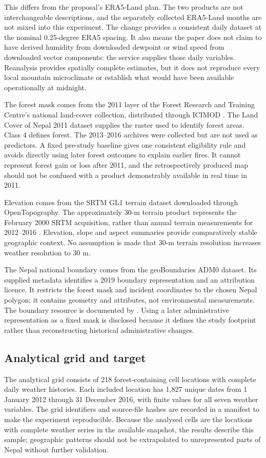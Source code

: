 \documentclass[conference,a4paper]{IEEEtran}
\begin{document}
This differs from the proposal's ERA5-Land plan. The two products are not interchangeable descriptions, and the separately collected ERA5-Land months are not mixed into this experiment. The change provides a consistent daily dataset at the nominal 0.25-degree ERA5 spacing. It also means the paper does not claim to have derived humidity from downloaded dewpoint or wind speed from downloaded vector components: the service supplies those daily variables. Reanalysis provides spatially complete estimates, but it does not reproduce every local mountain microclimate or establish what would have been available operationally at midnight.

The forest mask comes from the 2011 layer of the Forest Research and Training Centre's national land-cover collection, distributed through ICIMOD \citep{frtc}. The Land Cover of Nepal 2011 dataset supplies the raster used to identify forest areas. Class 4 defines forest. The 2013--2016 archives were collected but are not used as predictors. A fixed pre-study baseline gives one consistent eligibility rule and avoids directly using later forest outcomes to explain earlier fires. It cannot represent forest gain or loss after 2011, and the retrospectively produced map should not be confused with a product demonstrably available in real time in 2011.

Elevation comes from the SRTM GL1 terrain dataset downloaded through OpenTopography. The approximately 30-m terrain product represents the February 2000 SRTM acquisition, rather than annual terrain measurements for 2012--2016 \citep{srtm}. Elevation, slope and aspect summaries provide comparatively stable geographic context. No assumption is made that 30-m terrain resolution increases weather resolution to 30 m.

The Nepal national boundary comes from the geoBoundaries ADM0 dataset. Its supplied metadata identifies a 2019 boundary representation and an attribution licence. It restricts the forest mask and incident coordinates to the chosen Nepal polygon; it contains geometry and attributes, not environmental measurements. The boundary resource is documented by \citet{runfola}. Using a later administrative representation as a fixed mask is disclosed because it defines the study footprint rather than reconstructing historical administrative changes.

\subsection{Analytical grid and target}
The analytical grid consists of 218 forest-containing cell locations with complete daily weather histories. Each included location has 1,827 unique dates from 1 January 2012 through 31 December 2016, with finite values for all seven weather variables. The grid identifiers and source-file hashes are recorded in a manifest to make the experiment reproducible. Because the analysed cells are the locations with complete weather series in the available snapshot, the results describe this sample; geographic patterns should not be extrapolated to unrepresented parts of Nepal without further validation.
\end{document}

